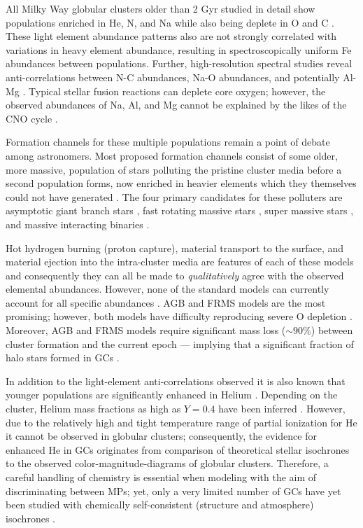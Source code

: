 All Milky Way globular clusters older than 2 Gyr studied in detail show
populations enriched in He, N, and Na while also being deplete in O and C
\citep{Piotto2015,Bastian2018}. These light element abundance patterns also are
not strongly correlated with variations in heavy element abundance, resulting
in spectroscopically uniform Fe abundances between populations. Further,
high-resolution spectral studies reveal anti-correlations between N-C
abundances, Na-O abundances, and potentially Al-Mg \citep{Sneden1992,
Gratton2012}. Typical stellar fusion reactions can deplete core oxygen;
however, the observed abundances of Na, Al, and Mg cannot be explained by the
likes of the CNO cycle \citep{Prantzos2007}.

Formation channels for these multiple populations remain a point of debate
among astronomers. Most proposed formation channels consist of some older,
more massive, population of stars polluting the pristine cluster media before a
second population forms, now enriched in heavier elements which they themselves could
not have generated \citep[for a detailed review see ][]{Gratton2012}. The four
primary candidates for these polluters are asymptotic giant branch stars
\citep[AGBs,][]{Ventura2001,DErcole2010}, fast rotating massive stars
\citep[FRMSs,][]{Decressin2007}, super massive stars
\citep[SMSs,][]{Denissenkov2014}, and massive interacting binaries
\citep[MIBs,][]{deMink2009, Bastian2018}. 

Hot hydrogen burning (proton capture), material transport to the surface, and
material ejection into the intra-cluster media are features of each of these
models and consequently they can all be made to {\it qualitatively} agree with
the observed elemental abundances. However, none of the standard models can
currently account for all specific abundances \citep{Gratton2012}. AGB and FRMS
models are the most promising; however, both models have difficulty reproducing
severe O depletion \citep{Ventura2009,Decressin2007}. Moreover, AGB and FRMS
models require significant mass loss ($\sim 90\%$) between cluster formation
and the current epoch --- implying that a significant fraction of halo stars
formed in GCs \citep{Renzini2008,DErcole2008,Bastian2015}.

In addition to the light-element anti-correlations observed it is also known
that younger populations are significantly enhanced in Helium
\citep{Piotto2007, Piotto2015, Latour2019}. Depending on the cluster, Helium
mass fractions as high as $Y=0.4$ have been inferred \citep[e.g][]{Milone2015}.
However, due to the relatively high and tight temperature range of partial
ionization for He it cannot be observed in globular clusters; consequently, the
evidence for enhanced He in GCs originates from comparison of theoretical
stellar isochrones to the observed color-magnitude-diagrams of globular
clusters. Therefore, a careful handling of chemistry is essential when modeling
with the aim of discriminating between MPs; yet, only a very limited number of
GCs have yet been studied with chemically self-consistent (structure and
atmosphere) isochrones \citep[e.g.][NGC 6752]{Dotter2015}. 

